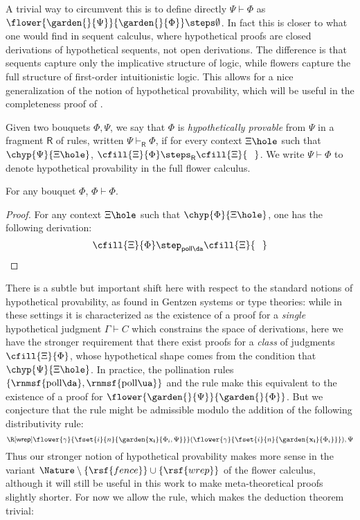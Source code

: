 A trivial way to circumvent this is to define directly $\Psi \vdash \Phi$ as
$\flower{\garden{{}}{\Psi}}{\garden{{}}{\Phi}} \steps \emptyset$. In fact this
is closer to what one would find in sequent calculus, where hypothetical proofs
are closed derivations of hypothetical sequents, not open derivations. The
difference is that sequents capture only the implicative structure of logic,
while flowers capture the full structure of first-order intuitionistic logic.
This allows for a nice generalization of the notion of hypothetical provability,
which will be useful in the completeness proof of . 

\begin{definition}
  Given two bouquets $\Phi, \Psi$, we say that $\Phi$ is \emph{hypothetically
  provable} from $\Psi$ in a fragment $\mathsf{R}$ of rules, written $\Psi
  \vdash_{\mathsf{R}} \Phi$, if for every context $\Xi\hole$ such that
  $\chyp{\Psi}{\Xi\hole}$, $\cfill{\Xi}{\Phi} \steps_{\mathsf{R}}
  \cfill{\Xi}{\phantom{\Phi}}$. We write $\Psi \vdash \Phi$ to denote
  hypothetical provability in the full flower calculus.
\end{definition}

\begin{lemma}[Reflexivity]
  For any bouquet $\Phi$, $\Phi \vdash \Phi$.
\end{lemma}
\begin{proof}
  For any context $\Xi\hole$ such that $\chyp{\Phi}{\Xi\hole}$, one has the following
  derivation:
  $$
  \cfill{\Xi}{\Phi} \step_{\mathsf{poll{\da}}}
  \cfill{\Xi}{\phantom{\Phi}}
  $$
\end{proof}

There is a subtle but important shift here with respect to the standard notions
of hypothetical provability, as found in Gentzen systems or type theories: while
in these settings it is characterized as the existence of a proof for a
\emph{single} hypothetical judgment $\Gamma \vdash C$ which constrains the space
of derivations, here we have the stronger requirement that there exist proofs
for a \emph{class} of judgments $\cfill{\Xi}{\Phi}$, whose hypothetical shape
comes from the condition that $\chyp{\Psi}{\Xi\hole}$. In practice, the
pollination rules $\{\text{\rnmsf{poll{\da}}},
\text{\rnmsf{poll{\ua}}}\}$ and the {} rule make this equivalent
to the existence of a proof for $\flower{\garden{{}}{\Psi}}{\garden{{}}{\Phi}}$. But
we conjecture that the {} rule might be admissible modulo the
addition of the following distributivity rule:
$$
\R[\textsf{wrep}]
  {\flower{\gamma}{\fset{i}{n}{\garden{\mathbf{x_i}}{\Phi_i, \Psi}}}}
  {(\flower{\gamma}{\fset{i}{n}{\garden{\mathbf{x_i}}{\Phi_i}}}), \Psi}
$$
Thus our stronger notion of hypothetical provability makes more sense in the
variant $\Nature \setminus \{\rsf{fence}\} \cup \{\rsf{wrep}\}$ of the flower
calculus, although it will still be useful in this work to make meta-theoretical
proofs slightly shorter. For now we allow the {} rule, which makes
the deduction theorem trivial:

